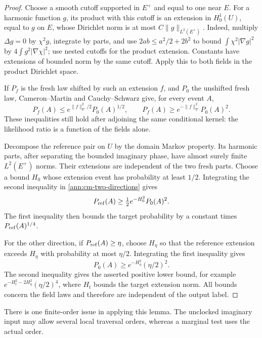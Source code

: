 \documentclass[11pt]{article}
\numberwithin{equation}{section}
\theoremstyle{definition}
\theoremstyle{remark}
\newcommand{\1}{\mathbf 1}
\begin{document}
\begin{proof}
Choose a smooth cutoff supported in \(E^+\) and equal to one near
\(E\).  For a harmonic function \(g\), its product with this cutoff
is an extension in \(H^1_0(U)\), equal to \(g\) on \(E\), whose
Dirichlet norm is at most \(C\|g\|_{L^2(E^+)}\).
Indeed, multiply \(\Delta g=0\) by \(\chi^2g\), integrate by parts,
and use \(2ab\le a^2/2+2b^2\) to bound
\(\int\chi^2|\nabla g|^2\) by
\(4\int g^2|\nabla\chi|^2\); use nested cutoffs for the product
extension.  Constants have extensions of bounded norm by the same
cutoff.  Apply this to both fields in the product Dirichlet space.

If \(P_f\) is the fresh law shifted by such an extension \(f\),
and \(P_0\) the unshifted fresh law, Cameron--Martin and
Cauchy--Schwarz give, for every event \(A\),
\begin{equation}
 P_f(A)\le e^{\|f\|_\nabla^2/2}P_0(A)^{1/2},
 \qquad
 P_f(A)\ge e^{-\|f\|_\nabla^2}P_0(A)^2.
 \label{ann:cm-two-directions}
\end{equation}
These inequalities still hold after adjoining the same conditional
kernel: the likelihood ratio is a function of the fields alone.

Decompose the reference pair on \(U\) by the domain Markov property.
Its harmonic parts, after separating the bounded imaginary phase,
have almost surely finite \(L^2(E^+)\) norms.  Their extensions are
independent of the two fresh parts.  Choose a bound \(H_0\) whose
extension event has probability at least \(1/2\).  Integrating the
second inequality in \eqref{ann:cm-two-directions} gives
\[
 P_{\rm ref}(A)\ge\tfrac12e^{-H_0^2}P_0(A)^2.
\]
The first inequality then bounds the target probability by a constant
times \(P_{\rm ref}(A)^{1/4}\).

For the other direction, if \(P_{\rm ref}(A)\ge\eta\), choose
\(H_\eta\) so that the reference extension exceeds \(H_\eta\)
with probability at most \(\eta/2\).  Integrating the first
inequality gives
\[
 P_0(A)\ge e^{-H_\eta^2}(\eta/2)^2.
\]
The second inequality gives the asserted positive lower bound,
for example \(e^{-H_t^2-2H_\eta^2}(\eta/2)^4\), where \(H_t\)
bounds the target extension norm.  All bounds concern the field
laws and therefore are independent of the output label.
\end{proof}

There is one finite-order issue in applying this lemma.  The
unclocked imaginary input may allow several local traversal orders,
whereas a marginal test uses the actual order.
\end{document}

